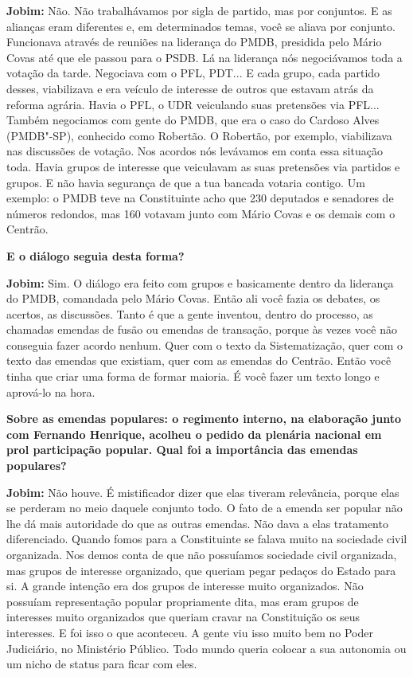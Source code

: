 \textbf{Jobim:} Não. Não trabalhávamos por sigla de partido, mas por
conjuntos. E as alianças eram diferentes e, em determinados temas, você
se aliava por conjunto. Funcionava através de reuniões na liderança do
PMDB, presidida pelo Mário Covas até que ele passou para o PSDB. Lá na
liderança nós negociávamos toda a votação da tarde. Negociava com o PFL,
PDT... E cada grupo, cada partido desses, viabilizava e era veículo de
interesse de outros que estavam atrás da reforma agrária. Havia o PFL, o
UDR veiculando suas pretensões via PFL... Também negociamos com gente do
PMDB, que era o caso do Cardoso Alves (PMDB"-SP), conhecido como
Robertão. O Robertão, por exemplo, viabilizava nas discussões de
votação. Nos acordos nós levávamos em conta essa situação toda. Havia
grupos de interesse que veiculavam as suas pretensões via partidos e
grupos. E não havia segurança de que a tua bancada votaria contigo. Um
exemplo: o PMDB teve na Constituinte acho que 230 deputados e senadores
de números redondos, mas 160 votavam junto com Mário Covas e os demais
com o Centrão.

\textbf{E o diálogo seguia desta forma?}

\textbf{Jobim:} Sim. O diálogo era feito com grupos e basicamente dentro
da liderança do PMDB, comandada pelo Mário Covas. Então ali você fazia
os debates, os acertos, as discussões. Tanto é que a gente inventou,
dentro do processo, as chamadas emendas de fusão ou emendas de
transação, porque às vezes você não conseguia fazer acordo nenhum. Quer
com o texto da Sistematização, quer com o texto das emendas que
existiam, quer com as emendas do Centrão. Então você tinha que criar uma
forma de formar maioria. É você fazer um texto longo e aprová-lo na
hora.

\textbf{Sobre as emendas populares: o regimento interno, na elaboração
junto com Fernando Henrique, acolheu o pedido da plenária nacional em
prol participação popular. Qual foi a importância das emendas
populares?}

\textbf{Jobim:} Não houve. É mistificador dizer que elas tiveram
relevância, porque elas se perderam no meio daquele conjunto todo. O
fato de a emenda ser popular não lhe dá mais autoridade do que as outras
emendas. Não dava a elas tratamento diferenciado. Quando fomos para a
Constituinte se falava muito na sociedade civil organizada. Nos demos
conta de que não possuíamos sociedade civil organizada, mas grupos de
interesse organizado, que queriam pegar pedaços do Estado para si. A
grande intenção era dos grupos de interesse muito organizados. Não
possuíam representação popular propriamente dita, mas eram grupos de
interesses muito organizados que queriam cravar na Constituição os seus
interesses. E foi isso o que aconteceu. A gente viu isso muito bem no
Poder Judiciário, no Ministério Público. Todo mundo queria colocar a sua
autonomia ou um nicho de status para ficar com eles.

